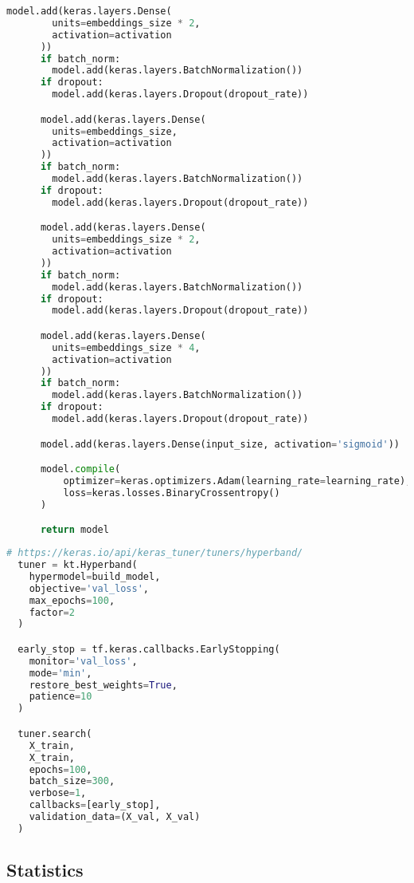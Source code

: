 \begin{lstlisting}[language=Python, caption=Model training and optimisation using Keras and Keras Tuner]
      model.add(keras.layers.Dense(
        units=embeddings_size * 2,
        activation=activation
      ))
      if batch_norm:
        model.add(keras.layers.BatchNormalization())
      if dropout:
        model.add(keras.layers.Dropout(dropout_rate))

      model.add(keras.layers.Dense(
        units=embeddings_size,
        activation=activation
      ))
      if batch_norm:
        model.add(keras.layers.BatchNormalization())
      if dropout:
        model.add(keras.layers.Dropout(dropout_rate))

      model.add(keras.layers.Dense(
        units=embeddings_size * 2,
        activation=activation
      ))
      if batch_norm:
        model.add(keras.layers.BatchNormalization())
      if dropout:
        model.add(keras.layers.Dropout(dropout_rate))

      model.add(keras.layers.Dense(
        units=embeddings_size * 4,
        activation=activation
      ))
      if batch_norm:
        model.add(keras.layers.BatchNormalization())
      if dropout:
        model.add(keras.layers.Dropout(dropout_rate))

      model.add(keras.layers.Dense(input_size, activation='sigmoid'))

      model.compile(
          optimizer=keras.optimizers.Adam(learning_rate=learning_rate),
          loss=keras.losses.BinaryCrossentropy()
      )

      return model
\end{lstlisting}

\begin{lstlisting}[language=Python, caption=Hyperband search and early stopping setup]
  # https://keras.io/api/keras_tuner/tuners/hyperband/
  tuner = kt.Hyperband(
    hypermodel=build_model,
    objective='val_loss',
    max_epochs=100,
    factor=2
  )

  early_stop = tf.keras.callbacks.EarlyStopping(
    monitor='val_loss',
    mode='min',
    restore_best_weights=True,
    patience=10
  )

  tuner.search(
    X_train,
    X_train,
    epochs=100,
    batch_size=300,
    verbose=1,
    callbacks=[early_stop],
    validation_data=(X_val, X_val)
  )
\end{lstlisting}

\subsection{Statistics}

